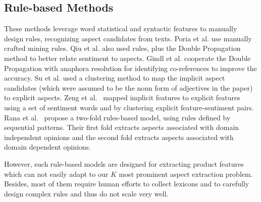 \subsection{Rule-based Methods}
These methods leverage word statistical and 
syntactic features to manually design rules, recognizing aspect candidates 
from texts.
Poria et al.  use manually crafted mining rules. 
Qiu et al.  also used rules, plus the 
Double Propagation method to better relate sentiment to aspects. 
Gindl et al.  cooperate the Double Propagation 
 with anaphora resolution for identifying 
co-references to improve the accuracy. 
Su et al.  used a clustering method to map 
the implicit aspect candidates (which were assumed to be the noun form 
of adjectives in the paper) to explicit aspects. 
Zeng et al.~ mapped implicit features 
to explicit features using a set of sentiment words and by clustering 
explicit feature-sentiment pairs.
Rana et al.~ propose a two-fold rules-based model, 
using rules defined by sequential patterns. Their first fold extracts aspects 
associated with domain independent opinions and the 
second fold extracts aspects 
associated with domain dependent opinions. 

However, such rule-based models are designed for extracting product 
features which can not easily adapt to our $K$ most prominent 
aspect extraction problem. Besides, most of them require human efforts 
to collect lexicons and to carefully design complex rules and 
thus do not scale very well. 

